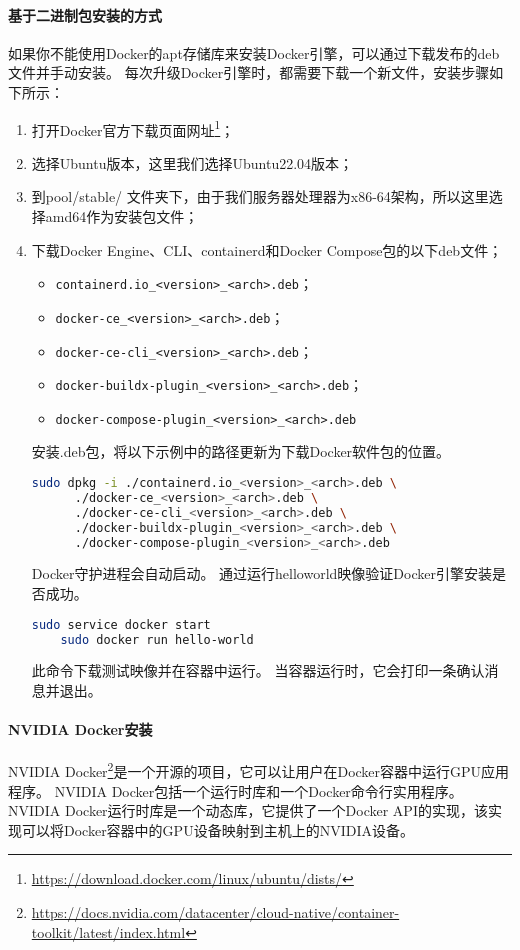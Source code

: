 \documentclass[lang=cn,a4paper,newtx]{elegantpaper}
\begin{document}
\paragraph{基于二进制包安装的方式}
如果你不能使用Docker的apt存储库来安装Docker引擎，可以通过下载发布的deb文件并手动安装。
每次升级Docker引擎时，都需要下载一个新文件，安装步骤如下所示：
\begin{enumerate}[label=(\arabic*). ]
  \item 打开Docker官方下载页面网址\footnote{\url{https://download.docker.com/linux/ubuntu/dists/}}；
  \item 选择Ubuntu版本，这里我们选择Ubuntu22.04版本；
  \item 到pool/stable/ 文件夹下，由于我们服务器处理器为x86-64架构，所以这里选择amd64作为安装包文件；
  \item 下载Docker Engine、CLI、containerd和Docker Compose包的以下deb文件；
  \begin{itemize}
    \item \verb|containerd.io_<version>_<arch>.deb|；
    \item \verb|docker-ce_<version>_<arch>.deb|；
    \item \verb|docker-ce-cli_<version>_<arch>.deb|；
    \item \verb|docker-buildx-plugin_<version>_<arch>.deb|；
    \item \verb|docker-compose-plugin_<version>_<arch>.deb|
  \end{itemize}
  安装.deb包，将以下示例中的路径更新为下载Docker软件包的位置。
  \begin{lstlisting}[language=bash]
    sudo dpkg -i ./containerd.io_<version>_<arch>.deb \
      ./docker-ce_<version>_<arch>.deb \
      ./docker-ce-cli_<version>_<arch>.deb \
      ./docker-buildx-plugin_<version>_<arch>.deb \
      ./docker-compose-plugin_<version>_<arch>.deb
  \end{lstlisting}
  Docker守护进程会自动启动。
  通过运行helloworld映像验证Docker引擎安装是否成功。
  \begin{lstlisting}[language=bash]
    sudo service docker start
    sudo docker run hello-world
  \end{lstlisting}
  此命令下载测试映像并在容器中运行。
  当容器运行时，它会打印一条确认消息并退出。
\end{enumerate}

\paragraph{NVIDIA Docker安装}
NVIDIA Docker\footnote{\url{https://docs.nvidia.com/datacenter/cloud-native/container-toolkit/latest/index.html}}是一个开源的项目，它可以让用户在Docker容器中运行GPU应用程序。
NVIDIA Docker包括一个运行时库和一个Docker命令行实用程序。
NVIDIA Docker运行时库是一个动态库，它提供了一个Docker API的实现，该实现可以将Docker容器中的GPU设备映射到主机上的NVIDIA设备。
\end{document}

